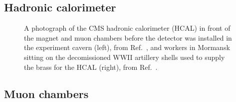 \subsection{Hadronic calorimeter}

\begin{figure}[htb]
    \centering
    \quad
    \caption{
        A photograph of the CMS hadronic calorimeter (HCAL) in front of the magnet and muon chambers before the detector was installed in the experiment cavern (left), from Ref.~\cite{Brice:1431485}, and workers in Mormansk sitting on the decomissioned WWII artillery shells used to supply the brass for the HCAL (right), from Ref.~\cite{GinterRussianDudes}.
    }
    \label{fig:cms_hcal}
\end{figure}

\subsection{Muon chambers}

